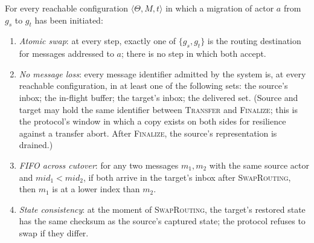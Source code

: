 \begin{theorem}
\label{thm:migration-safety}
For every reachable configuration \(\langle \Theta, M, t\rangle\)
in which a migration of actor \(a\) from \(g_s\) to \(g_t\) has
been initiated:
\begin{enumerate}
\item \emph{Atomic swap}: at every step, exactly one of
\(\{g_s, g_t\}\) is the routing destination for messages addressed
to \(a\); there is no step in which both accept.

\item \emph{No message loss}: every message identifier admitted by
the system is, at every reachable configuration, in at least one
of the following sets: the source's inbox; the in-flight buffer;
the target's inbox; the delivered set.  (Source and target may
hold the same identifier between \textsc{Transfer} and
\textsc{Finalize}; this is the protocol's window in which a copy
exists on both sides for resilience against a transfer abort.
After \textsc{Finalize}, the source's representation is drained.)

\item \emph{FIFO across cutover}: for any two messages \(m_1, m_2\)
with the same source actor and \(\mathit{mid}_1 < \mathit{mid}_2\),
if both arrive in the target's inbox after \textsc{SwapRouting},
then \(m_1\) is at a lower index than \(m_2\).

\item \emph{State consistency}: at the moment of
\textsc{SwapRouting}, the target's restored state has the same
checksum as the source's captured state; the protocol refuses to
swap if they differ.
\end{enumerate}
\end{theorem}

